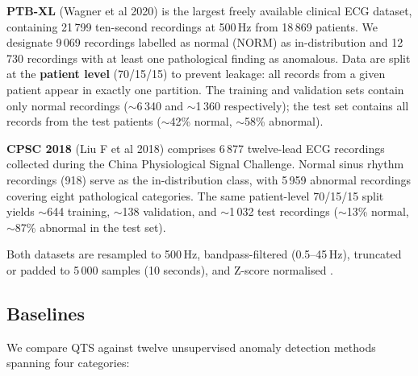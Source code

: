 \documentclass{iopjournal}
\begin{document}
\textbf{PTB-XL} (Wagner et al 2020) is the largest freely available clinical ECG dataset, containing 21\,799 ten-second recordings at 500\,Hz from 18\,869 patients. We designate 9\,069 recordings labelled as normal (NORM) as in-distribution and 12\,730 recordings with at least one pathological finding as anomalous. Data are split at the \textbf{patient level} (70/15/15) to prevent leakage: all records from a given patient appear in exactly one partition. The training and validation sets contain only normal recordings ($\sim$6\,340 and $\sim$1\,360 respectively); the test set contains all records from the test patients ($\sim$42\% normal, $\sim$58\% abnormal).

\textbf{CPSC 2018} (Liu F et al 2018) comprises 6\,877 twelve-lead ECG recordings collected during the China Physiological Signal Challenge. Normal sinus rhythm recordings (918) serve as the in-distribution class, with 5\,959 abnormal recordings covering eight pathological categories. The same patient-level 70/15/15 split yields $\sim$644 training, $\sim$138 validation, and $\sim$1\,032 test recordings ($\sim$13\% normal, $\sim$87\% abnormal in the test set).

Both datasets are resampled to 500\,Hz, bandpass-filtered (0.5--45\,Hz), truncated or padded to 5\,000 samples (10 seconds), and Z-score normalised . 

\subsection{Baselines}

We compare QTS against twelve unsupervised anomaly detection methods spanning four categories:
\end{document}
